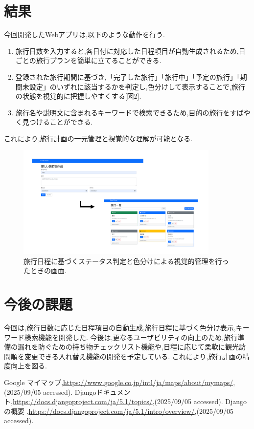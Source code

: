 \documentclass[a4j,twocolumn]{jsarticle}
\begin{document}
\section{結果}
\label{sec:org13b4891}
今回開発したWebアプリは,以下のような動作を行う.

\begin{enumerate}
\item 旅行日数を入力すると,各日付に対応した日程項目が自動生成されるため,日ごとの旅行プランを簡単に立てることができる.
\item 登録された旅行期間に基づき,「完了した旅行」「旅行中」「予定の旅行」「期間未設定」のいずれに該当するかを判定し,色分けして表示することで,旅行の状態を視覚的に把握しやすくする[図2].
\item 旅行名や説明文に含まれるキーワードで検索できるため,目的の旅行をすばやく見つけることができる.
\end{enumerate}
これにより,旅行計画の一元管理と視覚的な理解が可能となる.

\begin{figure}[htbp]
\centering
\includegraphics[width=10cm]{./figs/trip1.png}
\caption{\label{fig:org11f2275}旅行日程に基づくステータス判定と色分けによる視覚的管理を行ったときの画面.}
\end{figure}


\section{今後の課題}
\label{sec:orgd5b4b79}
今回は,旅行日数に応じた日程項目の自動生成,旅行日程に基づく色分け表示,キーワード検索機能を開発した.
今後は,更なるユーザビリティの向上のため,旅行準備の漏れを防ぐための持ち物チェックリスト機能や,日程に応じて柔軟に観光訪問順を変更できる入れ替え機能の開発を予定している.
これにより,旅行計画の精度向上を図る.


\small\setlength\baselineskip{10pt}
\begin{thebibliography}{9}

 Google マイマップ,\url{https://www.google.co.jp/intl/ja/maps/about/mymaps/},(2025/09/05 accessed).
Djangoドキュメント,\url{https://docs.djangoproject.com/ja/5.1/topics/},(2025/09/05 accessed).
Djangoの概要 ,\url{https://docs.djangoproject.com/ja/5.1/intro/overview/},(2025/09/05 accessed).
\end{thebibliography}
\end{document}
